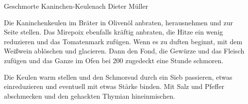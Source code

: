 \begin{recipe}{Geschmorte Kaninchen-Keule}{nach Dieter Müller}
  \inglist

  \steps
  Die Kaninchenkeulen im Bräter in Olivenöl anbraten, herausnehmen und zur Seite stellen.
  Das Mirepoix ebenfalls kräftig anbraten, die Hitze ein wenig reduzieren und das
  Tomatenmark zufügen. Wenn es zu duften beginnt, mit dem Weißwein ablöschen und
  glacieren. Dann den Fond, die Gewürze und das Fleisch zufügen und das Ganze im Ofen bei
  200 \celsius zugedeckt eine Stunde schmoren.

  Die Keulen warm stellen und den Schmorsud durch ein Sieb passieren, etwas einreduzieren
  und eventuell mit etwas Stärke binden. Mit Salz und Pfeffer abschmecken und den
  gehackten Thymian hineinmischen.
\end{recipe}
